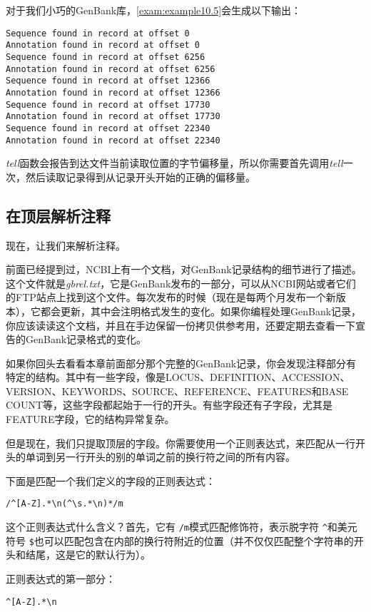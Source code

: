 对于我们小巧的GenBank库，\autoref{exam:example10.5}会生成以下输出：

\begin{lstlisting}
Sequence found in record at offset 0
Annotation found in record at offset 0
Sequence found in record at offset 6256
Annotation found in record at offset 6256
Sequence found in record at offset 12366
Annotation found in record at offset 12366
Sequence found in record at offset 17730
Annotation found in record at offset 17730
Sequence found in record at offset 22340
Annotation found in record at offset 22340
\end{lstlisting}

\textit{tell}函数会报告到达文件当前读取位置的字节偏移量，所以你需要首先调用\textit{tell}一次，然后读取记录得到从记录开头开始的正确的偏移量。

\subsection{在顶层解析注释}
现在，让我们来解析注释。

前面已经提到过，NCBI上有一个文档，对GenBank记录结构的细节进行了描述。这个文件就是\textit{gbrel.txt}，它是GenBank发布的一部分，可以从NCBI网站或者它们的FTP站点上找到这个文件。每次发布的时候（现在是每两个月发布一个新版本），它都会更新，其中会注明格式发生的变化。如果你编程处理GenBank记录，你应该读读这个文档，并且在手边保留一份拷贝供参考用，还要定期去查看一下宣告的GenBank记录格式的变化。

如果你回头去看看本章前面部分那个完整的GenBank记录，你会发现注释部分有特定的结构。其中有一些字段，像是LOCUS、DEFINITION、ACCESSION、VERSION、KEYWORDS、SOURCE、REFERENCE、FEATURES和BASE COUNT等，这些字段都起始于一行的开头。有些字段还有子字段，尤其是FEATURE字段，它的结构异常复杂。

但是现在，我们只提取顶层的字段。你需要使用一个正则表达式，来匹配从一行开头的单词到另一行开头的别的单词之前的换行符之间的所有内容。

下面是匹配一个我们定义的字段的正则表达式：

\begin{lstlisting}
/^[A-Z].*\n(^\s.*\n)*/m
\end{lstlisting}

这个正则表达式什么含义？首先，它有 \verb|/m|模式匹配修饰符，表示脱字符 \verb|^|和美元符号 \verb|$|也可以匹配包含在内部的换行符附近的位置（并不仅仅匹配整个字符串的开头和结尾，这是它的默认行为）。

正则表达式的第一部分：
  
\begin{lstlisting}
^[A-Z].*\n
\end{lstlisting}

